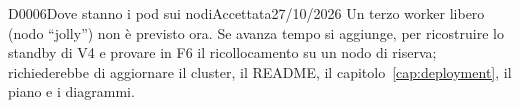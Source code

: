 \begin{decisione}{D0006}{Dove stanno i pod sui nodi}{Accettata}{27/10/2026}
Un terzo worker libero (nodo ``jolly'') non è previsto ora. Se avanza tempo si aggiunge, per ricostruire lo standby di V4 e provare in F6 il ricollocamento su un nodo di riserva; richiederebbe di aggiornare il cluster, il README, il capitolo~\ref{cap:deployment}, il piano e i diagrammi.

\end{decisione}
